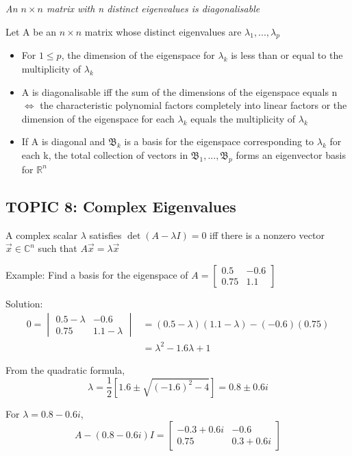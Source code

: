 \documentclass[12pt]{article} %
\newcommand{\R}{\mathbb{R}}
\begin{document}
\emph{An $n \times n$ matrix with n distinct eigenvalues is diagonalisable}

Let A be an $n \times n$ matrix whose distinct eigenvalues are $\lambda_1, ...,\lambda_p$
\begin{itemize}
	\item For $1 \leq p$, the dimension of the eigenspace for $\lambda_k$ is less than or equal to the multiplicity of $\lambda_k$
	\item A is diagonalisable iff the sum of the dimensions of the eigenspace equals n $\iff$ the characteristic polynomial factors completely into linear factors or the dimension of the eigenspace for each $\lambda_k$ equals the multiplicity of $\lambda_k$
	\item If A is diagonal and $\mathfrak{B}_k$ is a basis for the eigenspace corresponding to $\lambda_k$ for each k, the total collection of vectors in $\mathfrak{B}_1, ..., \mathfrak{B}_p$ forms an eigenvector basis for $\R^n$
\end{itemize}

\subsection{TOPIC 8: Complex Eigenvalues}
A complex scalar $\lambda$ satisfies $\det(A - \lambda I) = 0$ iff there is a nonzero vector $\vec{x} \in \mathbb{C}^n$ such that $A \vec{x} = \lambda \vec{x}$

Example: Find a basis for the eigenspace of $A = \begin{bmatrix}
	0.5 & -0.6\\
	0.75 & 1.1
\end{bmatrix}$

Solution:
\begin{align*}
	0 = \begin{vmatrix}
		0.5 - \lambda & -0.6\\
		0.75 & 1.1 - \lambda
	\end{vmatrix} &= (0.5 - \lambda)(1.1 - \lambda)- (-0.6)(0.75)\\
	&= \lambda^2 -1.6 \lambda + 1
\end{align*}

From the quadratic formula,
$$\lambda = \frac{1}{2}[1.6 \pm \sqrt{(-1.6)^2 - 4}] = 0.8 \pm 0.6i$$

For $\lambda = 0.8 - 0.6i$, 
$$A - (0.8 - 0.6i)I = \begin{bmatrix}
	-0.3 + 0.6i & -0.6\\
	0.75 & 0.3 + 0.6i
\end{bmatrix}$$
\end{document}
